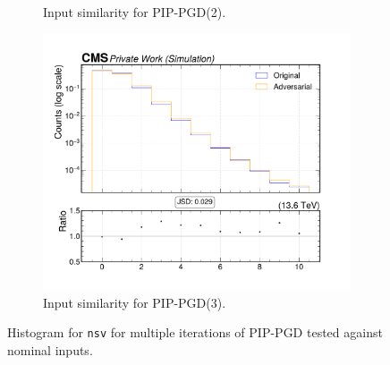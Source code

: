 \begin{figure}[htbp]
\begin{subfigure}[t]{0.32\textwidth}
    \caption*{Input similarity for PIP-PGD(2).}
  \end{subfigure}\hfill
  \begin{subfigure}[t]{0.32\textwidth}
    \includegraphics[width=\linewidth]{media/output/features/compare/combined_it_3/cmp_global_features_nsv.pdf}
    \caption*{Input similarity for PIP-PGD(3).}
  \end{subfigure}

  \caption*{Histogram for \texttt{nsv} for multiple iterations of PIP-PGD tested against nominal inputs.}
  \label{fig:combined_input_nsv}
\end{figure}

